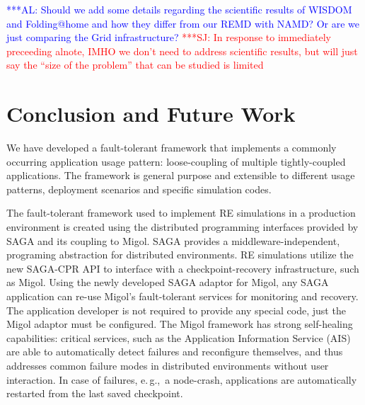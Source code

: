 \documentclass{rspublic}
\newcommand{\up}{}%
\newcommand{\alnote}[1]{ {\textcolor{blue} { ***AL: #1 }}}
\newcommand{\jhanote}[1]{ {\textcolor{red} { ***SJ: #1 }}}
\newcommand{\alnote}[1]{}
\newcommand{\jhanote}[1]{}
\begin{document}
\alnote{Should we add some details regarding the scientific results of
  WISDOM and Folding@home and how they differ from our REMD with NAMD?
  Or are we just comparing the Grid infrastructure?}  \jhanote{In
  response to immediately preceeding alnote, IMHO we don't need to
  address scientific results, but will just say the ``size of the
  problem'' that can be studied is limited}

% 

\section{Conclusion and Future Work}

\up We have developed a fault-tolerant framework that implements a
commonly occurring application usage pattern: loose-coupling of
multiple tightly-coupled applications. The framework is general
purpose and extensible to different usage patterns, deployment
scenarios and specific simulation codes.

The fault-tolerant framework used to implement RE simulations in a
production environment is created using the distributed programming
interfaces provided by SAGA and its coupling to Migol.  SAGA provides
a middleware-independent, programing abstraction for distributed
environments. RE simulations utilize the new SAGA-CPR API to interface
with a checkpoint-recovery infrastructure, such as Migol. Using the
newly developed SAGA adaptor for Migol, any SAGA application can
re-use Migol's fault-tolerant services for monitoring and recovery.
The application developer is not required to provide any special code,
just the Migol adaptor must be configured.  The Migol framework has
strong self-healing capabilities: critical services, such as the
Application Information Service (AIS) are able to automatically detect
failures and reconfigure themselves, and thus addresses common failure
modes in distributed environments without user interaction.
In case of failures, e.\,g.,\ a node-crash, applications are
automatically restarted from the last saved
checkpoint. %
\end{document}
